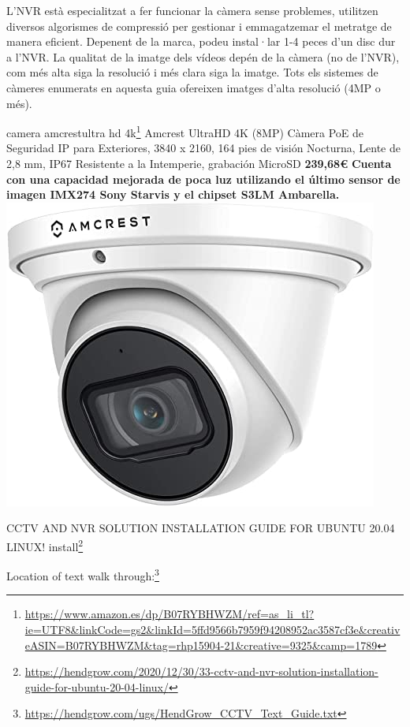 \documentclass[
  10pt,
]{krantz}
\DeclareRobustCommand{\href}[2]{#2\footnote{\url{#1}}}
\begin{document}
L'NVR està especialitzat a fer funcionar la càmera sense problemes, utilitzen diversos algorismes de compressió per gestionar i emmagatzemar el metratge de manera eficient. Depenent de la marca, podeu instal·lar 1-4 peces d'un disc dur a l'NVR. La qualitat de la imatge dels vídeos depén de la càmera (no de l'NVR), com més alta siga la resolució i més clara siga la imatge. Tots els sistemes de càmeres enumerats en aquesta guia ofereixen imatges d'alta resolució (4MP o més).

\href{https://www.amazon.es/dp/B07RYBHWZM/ref=as_li_tl?ie=UTF8\&linkCode=gs2\&linkId=5ffd9566b7959f94208952ac3587cf3e\&creativeASIN=B07RYBHWZM\&tag=rhp15904-21\&creative=9325\&camp=1789}{camera amcrestultra hd 4k} Amcrest UltraHD 4K (8MP) Càmera PoE de Seguridad IP para Exteriores, 3840 x 2160, 164 pies de visión Nocturna, Lente de 2,8 mm, IP67 Resistente a la Intemperie, grabación MicroSD \textbf{239,68€} \textbf{Cuenta con una capacidad mejorada de poca luz utilizando el último sensor de imagen IMX274 Sony Starvis y el chipset S3LM Ambarella.} \includegraphics{imatges/amcrest.jpg}

CCTV AND NVR SOLUTION INSTALLATION GUIDE FOR UBUNTU 20.04 LINUX! \href{https://hendgrow.com/2020/12/30/33-cctv-and-nvr-solution-installation-guide-for-ubuntu-20-04-linux/}{install}

\href{https://hendgrow.com/ugs/HendGrow_CCTV_Text_Guide.txt}{Location of text walk through:}
\end{document}

